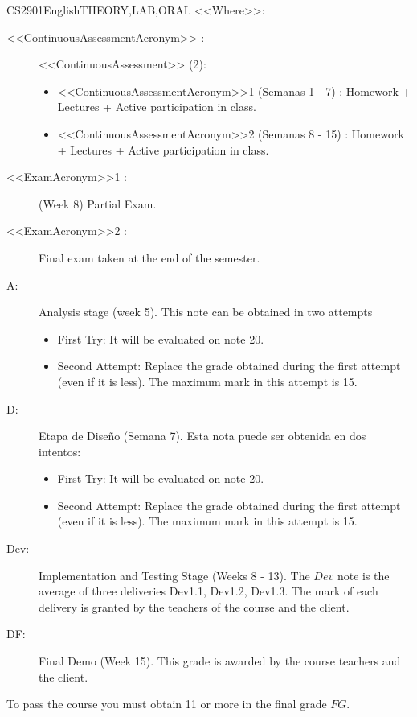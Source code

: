 \begin{evaluation}{CS2901}{English}{THEORY,LAB,ORAL}
    \vspace{2mm}
    \noindent <<Where>>:
    \begin{description}
      \item[<<ContinuousAssessmentAcronym>> :] <<ContinuousAssessment>> (2):
        \begin{itemize}
            \item  <<ContinuousAssessmentAcronym>>1 (Semanas 1 - 7)  : Homework + Lectures + Active participation in class.
            \item <<ContinuousAssessmentAcronym>>2 (Semanas 8 - 15) : Homework + Lectures + Active participation in class.
        \end{itemize}
      \item[<<ExamAcronym>>1 :] (Week 8) Partial Exam.
      \item[<<ExamAcronym>>2 :]  Final exam taken at the end of the semester.
      \item[A:] Analysis stage (week 5). This note can be obtained in two attempts
        \begin{itemize}
          \item[] First Try: It will be evaluated on note 20.
          \item[] Second Attempt: Replace the grade obtained during the first attempt (even if it is less). The maximum mark in this attempt is 15.
        \end{itemize}
      \item[D:] Etapa de Diseño (Semana 7). Esta nota puede ser obtenida en dos intentos:
        \begin{itemize}
          \item[] First Try: It will be evaluated on note 20.
          \item[] Second Attempt: Replace the grade obtained during the first attempt (even if it is less). The maximum mark in this attempt is 15.
        \end{itemize}
      \item[Dev:] Implementation and Testing Stage (Weeks 8 - 13). The $Dev$ note is the average of three deliveries Dev1.1, Dev1.2, Dev1.3. The mark of each delivery is granted by the teachers of the course and the client.
      \item[DF:] Final Demo (Week 15). This grade is awarded by the course teachers and the client.
    \end{description}
 
  \noindent To pass the course you must obtain 11 or more in the final grade $FG$.
  \end{evaluation}



